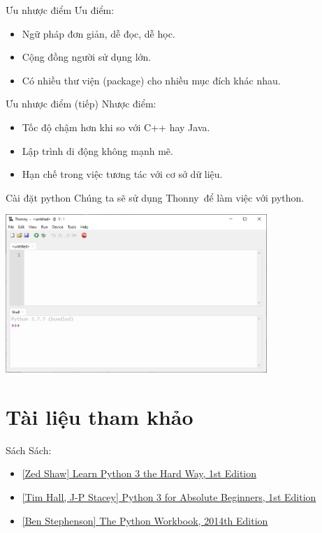 \documentclass[11pt]{beamer}
\begin{document}
  \begin{frame}{Ưu nhược điểm}
    Ưu điểm:
    \begin{itemize}
      \item Ngữ pháp đơn giản, dễ đọc, dễ học.
      \item Cộng đồng người sử dụng lớn.
      \item Có nhiều thư viện (package) cho nhiều mục đích khác nhau.
    \end{itemize}
  \end{frame}

  \begin{frame}{Ưu nhược điểm (tiếp)}
    Nhược điểm:
    \begin{itemize}
      \item Tốc độ chậm hơn khi so với C++ hay Java.
      \item Lập trình di động không mạnh mẽ.
      \item Hạn chế trong việc tương tác với cơ sở dữ liệu.
    \end{itemize}
  \end{frame}

  \begin{frame}{Cài đặt python}
    Chúng ta sẽ sử dụng Thonny\footnotemark\ để làm việc với python.\\
    \begin{center}
      \includegraphics[height=6cm]{thonny.png}
    \end{center}
  \end{frame}

  \section{Tài liệu tham khảo}
  \begin{frame}{Sách}
    Sách:
    \begin{itemize}
      \item \href{https://www.amazon.com/Learn-Python-Hard-Way-Introduction/dp/0134692888}{[Zed Shaw] Learn Python 3 the Hard Way, 1st Edition}
      \item \href{https://www.amazon.com/Python-Absolute-Beginners-Tim-Hall/dp/1430216328}{[Tim Hall, J-P Stacey] Python 3 for Absolute Beginners, 1st Edition}
      \item \href{https://www.amazon.com/Python-Workbook-Introduction-Exercises-Solutions-ebook/dp/B00SMA956U}{[Ben Stephenson] The Python Workbook, 2014th Edition}
    \end{itemize}
  \end{frame}
\end{document}
